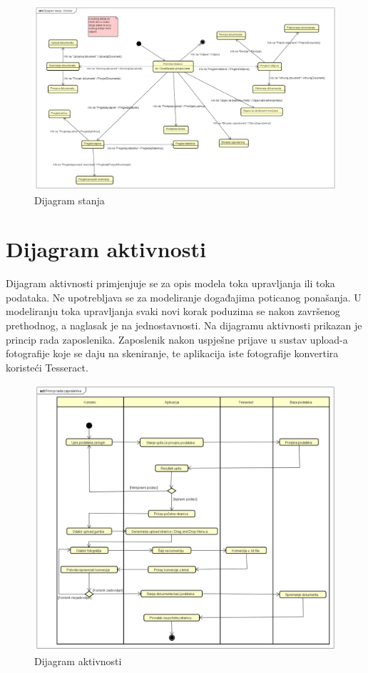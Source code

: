 			\begin{figure}[H]
				\includegraphics[scale=0.35]{slike/DijagramStanja - Direktor.png} %
				\centering
				\caption{Dijagram stanja}
				\label{fig:promjene}
			\end{figure}

			\eject 
		
		\section{Dijagram aktivnosti}
			
			
			Dijagram aktivnosti primjenjuje se za opis modela toka upravljanja ili toka podataka. Ne upotrebljava se za modeliranje događajima poticanog ponašanja. U modeliranju toka upravljanja svaki novi korak poduzima se nakon završenog prethodnog, a naglasak je na jednostavnosti. Na dijagramu aktivnosti prikazan je princip rada zaposlenika. Zaposlenik nakon uspješne prijave u sustav upload-a fotografije koje se daju na skeniranje, te aplikacija iste fotografije konvertira koristeći Tesseract.

			\begin{figure}[H]
				\includegraphics[scale=0.4]{slike/dijagram_aktivnosti.png} %
				\centering
				\caption{Dijagram aktivnosti}
				\label{fig:promjene}
			\end{figure}


